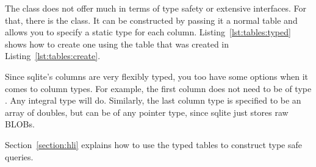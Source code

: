 The  class does not offer much in terms of type safety or extensive interfaces. For that, there is the  class. It can be constructed by passing it a normal table and allows you to specify a static type for each column. Listing~\ref{lst:tables:typed} shows how to create one using the table that was created in Listing~\ref{lst:tables:create}.



Since sqlite's columns are very flexibly typed, you too have some options when it comes to column types. For example, the first column does not need to be of type . Any integral type will do. Similarly, the last column type is specified to be an array of doubles, but can be of any pointer type, since sqlite just stores raw BLOBs.

Section~\ref{section:hli} explains how to use the typed tables to construct type safe queries.